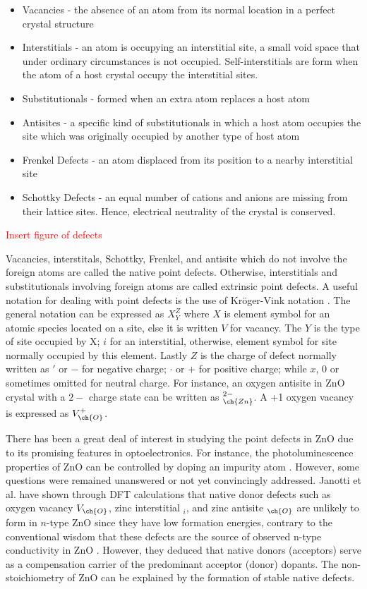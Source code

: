 \begin{itemize}
	\item Vacancies - the absence of an atom from its normal location in a perfect crystal structure
	\item Interstitials - an atom is occupying an interstitial site, a small void space that under ordinary circumstances is not occupied. Self-interstitials are form when the atom of a host crystal occupy the interstitial sites.
	\item Substitutionals - formed when an extra atom replaces a host atom
	\item Antisites - a specific kind of substitutionals in which a host atom occupies the site which was originally occupied by another type of host atom
	\item Frenkel Defects - an atom displaced from its position to a nearby interstitial site
	\item Schottky Defects - an equal  number  of  cations  and anions  are missing  from  their  lattice  sites. Hence,  electrical  neutrality  of  the  crystal is conserved.

\end{itemize}

\textcolor{red}{Insert figure of defects}

Vacancies, interstitals, Schottky, Frenkel, and antisite which do not involve the foreign atoms are called the native point defects. Otherwise, interstitials and substitutionals involving foreign atoms are called extrinsic point defects. A useful notation for dealing with point defects is the use of  Kröger-Vink notation \citep{Kroeger1964}. The general notation can  be expressed as  $X_Y^Z$ where $X$ is element symbol for an atomic species located on a site, else it is written $V$ for vacancy. The $Y$ is the type of site occupied by X; $i$ for an interstitial, otherwise, element symbol for site normally occupied by this element. Lastly $Z$ is the charge of defect normally written as $'$ or $-$ for negative charge; $\cdot$ or $+$ for positive charge; while $x$, $0$ or sometimes omitted for neutral charge. For instance, an oxygen antisite in ZnO crystal with a $2-$ charge state can be written as $_{\ch{Zn}}^{2-}$. A +1 oxygen vacancy is expressed as $V_{\ch{O}}^{+}$.

There has been a great deal of interest in studying the point defects in ZnO due to its promising features in optoelectronics. For instance, the photoluminescence properties of ZnO can be controlled by doping an impurity atom \citep{Musavi2019}.  However, some questions were remained unanswered or not yet convincingly addressed. Janotti et al. \citep{Janotti2007} have shown through DFT calculations that native donor defects such as oxygen vacancy $V_{\ch{O}}$, zinc interstitial $_i$, and zinc antisite $_{\ch{O}}$  are unlikely to form in $n$-type ZnO since they have low formation energies, contrary to the conventional wisdom that these defects are the source of  observed n-type conductivity in ZnO \citep{Harrison1954,Thomas1957,Hausmann1973,Hagemark1976}. However, they deduced that native donors (acceptors) serve as a compensation carrier of the predominant acceptor (donor) dopants.  The non-stoichiometry of ZnO can be explained by the formation of stable native defects.


